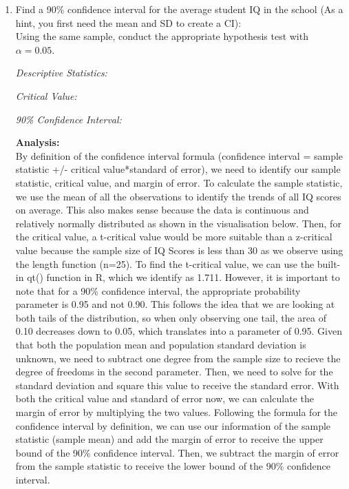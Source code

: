 \documentclass[12pt,letterpaper]{article}
\begin{document}
	\begin{enumerate}
		\item Find a 90\% confidence interval for the average student IQ in the school (As a hint, you first need the mean and SD to create a CI):\\
		
		\noindent Using the same sample, conduct the appropriate hypothesis test with $\alpha=0.05$.
		
		\textit{Descriptive Statistics:}
		
		
		\textit{Critical Value:}
		
		
		\textit{90\% Confidence Interval:}
		
		
		\textbf{Analysis:}\\
		By definition of the confidence interval formula (confidence interval = sample statistic +/- critical value*standard of error), we need to identify our sample statistic, critical value, and margin of error. To calculate the sample statistic, we use the mean of all the observations to identify the trends of all IQ scores on average. This also makes sense because the data is continuous and relatively normally distributed as shown in the visualisation below. Then, for the critical value, a t-critical value would be more suitable than a z-critical value because the sample size of IQ Scores is less than 30 as we observe using the length function (n=25). To find the t-critical value, we can use the built-in qt() function in R, which we identify as 1.711. However, it is important to note that for a 90\% confidence interval, the appropriate probability parameter is 0.95 and not 0.90. This follows the idea that we are looking at both tails of the distribution, so when only observing one tail, the area of 0.10 decreases down to 0.05, which translates into a parameter of 0.95. Given that both the population mean and population standard deviation is unknown, we need to subtract one degree from the sample size to recieve the degree of freedoms in the second parameter. Then, we need to solve for the standard deviation and square this value to receive the standard error. With both the critical value and standard of error now, we can calculate the margin of error by multiplying the two values. Following the formula for the confidence interval by definition, we can use our information of the sample statistic (sample mean) and add the margin of error to receive the upper bound of the 90\% confidence interval. Then, we subtract the margin of error from the sample statistic to receive the lower bound of the 90\% confidence interval.
		

\end{enumerate}
\end{document}
